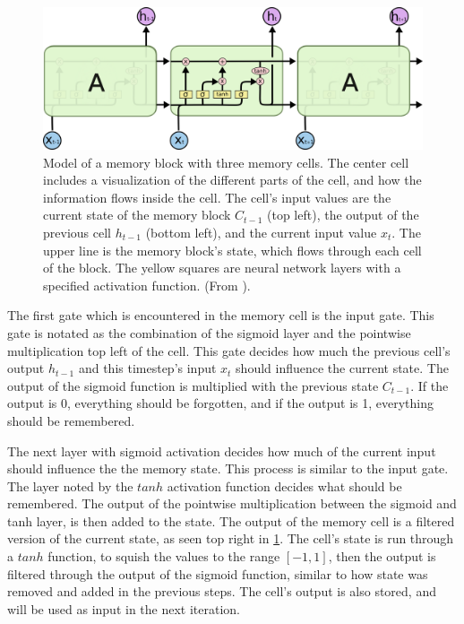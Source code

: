 \begin{figure}[H]
    \centering
    \includegraphics[width=\textwidth]{Assets/Chapter2_Theory/LSTM3-chain.png}
    \caption{Model of a memory block with three memory cells. The center cell includes a visualization of the different parts of the cell, and how the information flows inside the cell. The cell's input values are the current state of the memory block $C_{t-1}$ (top left), the output of the previous cell $h_{t-1}$ (bottom left), and  the current input value $x_t$. The upper line is the memory block's state, which flows through each cell of the block. The yellow squares are neural network layers with a specified activation function. (From \cite{Understanding LSTM Networks -- colah's blog}).}
    \label{fig:lstm_cells}
\end{figure}

The first gate which is encountered in the memory cell is the input gate. This gate is notated as the combination of the sigmoid layer and the pointwise multiplication top left of the cell. This gate decides how much the previous cell's output $h_{t-1}$ and this timestep's input $x_t$ should influence the current state. The output of the sigmoid function is multiplied with the previous state $C_{t-1}$. If the output is 0, everything should be forgotten, and if the output is 1, everything should be remembered. 

The next layer with sigmoid activation decides how much of the current input should influence the the memory state. This process is similar to the input gate. The layer noted by the $tanh$ activation function decides what should be remembered. The output of the pointwise multiplication between the sigmoid and tanh layer, is then added to the state.
The output of the memory cell is a filtered version of the current state, as seen top right in \ref{fig:lstm_cells}. The cell's state is run through a $tanh$ function, to squish the values to the range $[-1, 1]$, then the output is filtered through the output of the sigmoid function, similar to how state was removed and added in the previous steps. The cell's output is also stored, and will be used as input in the next iteration. 

